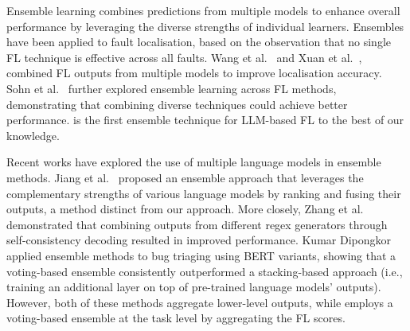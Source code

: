 Ensemble learning combines predictions from multiple models to enhance overall performance by leveraging the diverse strengths of individual learners. Ensembles have been applied to fault localisation, based on the observation that no single FL technique is effective across all faults. Wang et al.~\cite{wangSearchbasedFaultLocalization2011} and Xuan et al.~\cite{xuanLearningCombineMultiple2014}, combined FL outputs from multiple models to improve localisation accuracy. Sohn et al.~\cite{sohnWhyTrainselectWhen2019b} further explored ensemble learning across FL methods, demonstrating that combining diverse techniques could achieve better performance. \cosmosfl is the first ensemble technique for LLM-based FL to the best of our knowledge.

Recent works have explored the use of multiple language models in ensemble methods. Jiang et al.~\cite{jiang2023llmblender} proposed an ensemble approach that leverages the complementary strengths of various language models by ranking and fusing their outputs, a method distinct from our approach. More closely, Zhang et al.~\cite{zhangInfeREStepbyStepRegex2023} demonstrated that combining outputs from different regex generators through self-consistency decoding resulted in improved performance. Kumar Dipongkor~\cite{kumardipongkorEnsembleMethodBug2024a} applied ensemble methods to bug triaging using BERT variants, showing that a voting-based ensemble consistently outperformed a stacking-based approach (i.e., training an additional layer on top of pre-trained language models' outputs). However, both of these methods aggregate lower-level outputs, while \cosmosfl employs a voting-based ensemble at the task level by aggregating the FL scores.